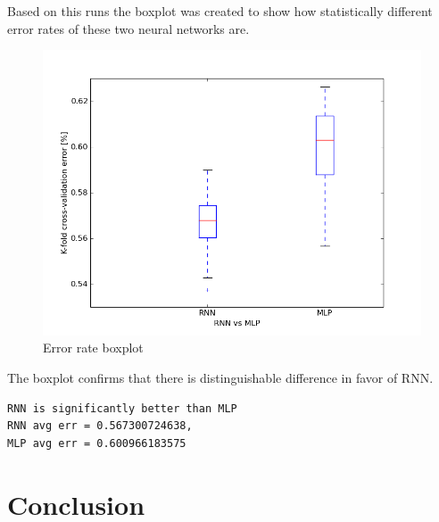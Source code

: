 \documentclass[twoside]{article}
\begin{document}
\begin{multicols}{2}
Based on this runs the boxplot was created to show how statistically different error rates of these two neural networks are.
\begin{figure}[H]
\centering
\includegraphics[scale=0.4]{../results/rnn_vs_mlp_200iters_20cross}
\caption{Error rate boxplot}
\label{ref:rnn}
\end{figure}
The boxplot confirms that there is distinguishable difference in favor of RNN.
\begin{lstlisting}[caption={RNN vs MLP with 200 epochs and 20 crossvalidation steps output:}]
RNN is significantly better than MLP
RNN avg err = 0.567300724638, 
MLP avg err = 0.600966183575
\end{lstlisting}

\section{Conclusion}


\end{multicols}
\end{document}
